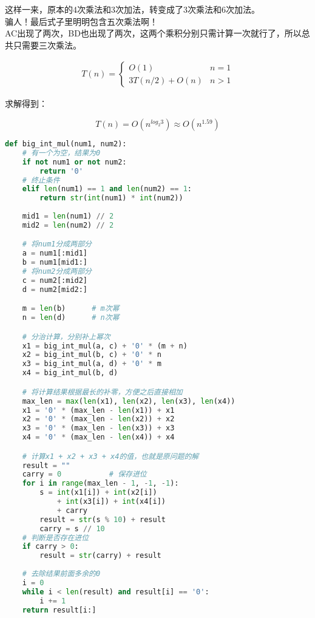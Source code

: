 这样一来，原本的4次乘法和3次加法，转变成了3次乘法和6次加法。 \\

骗人！最后式子里明明包含五次乘法啊！ \\

AC出现了两次，BD也出现了两次，这两个乘积分别只需计算一次就行了，所以总共只需要三次乘法。

\vspace{-0.5cm}

\begin{align*}
    T(n) = \begin{cases}
        O(1)           & n = 1 \\
        3T(n/2) + O(n) & n > 1
    \end{cases}
\end{align*}

求解得到：

\vspace{-0.5cm}

$$
    T(n) = O(n^{log_2{3}}) \approx O(n^{1.59})
$$

\vspace{0.5cm}


\begin{lstlisting}[language=Python]
def big_int_mul(num1, num2):
    # 有一个为空，结果为0
    if not num1 or not num2:
        return '0'
    # 终止条件
    elif len(num1) == 1 and len(num2) == 1:
        return str(int(num1) * int(num2))
    
    mid1 = len(num1) // 2
    mid2 = len(num2) // 2

    # 将num1分成两部分
    a = num1[:mid1]
    b = num1[mid1:]
    # 将num2分成两部分
    c = num2[:mid2]
    d = num2[mid2:]

    m = len(b)      # m次幂
    n = len(d)      # n次幂

    # 分治计算，分别补上幂次
    x1 = big_int_mul(a, c) + '0' * (m + n)
    x2 = big_int_mul(b, c) + '0' * n
    x3 = big_int_mul(a, d) + '0' * m
    x4 = big_int_mul(b, d)

    # 将计算结果根据最长的补零，方便之后直接相加
    max_len = max(len(x1), len(x2), len(x3), len(x4))
    x1 = '0' * (max_len - len(x1)) + x1
    x2 = '0' * (max_len - len(x2)) + x2
    x3 = '0' * (max_len - len(x3)) + x3
    x4 = '0' * (max_len - len(x4)) + x4

    # 计算x1 + x2 + x3 + x4的值，也就是原问题的解
    result = ""
    carry = 0           # 保存进位
    for i in range(max_len - 1, -1, -1):
        s = int(x1[i]) + int(x2[i]) 
            + int(x3[i]) + int(x4[i])
            + carry
        result = str(s % 10) + result
        carry = s // 10
    # 判断是否存在进位
    if carry > 0:
        result = str(carry) + result
    
    # 去除结果前面多余的0
    i = 0
    while i < len(result) and result[i] == '0':
        i += 1
    return result[i:]
\end{lstlisting}

